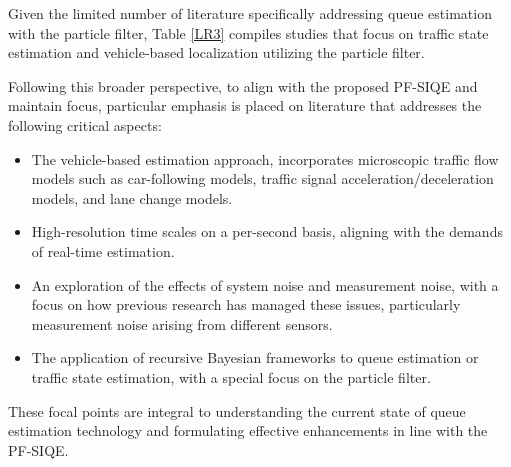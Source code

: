 Given the limited number of literature specifically addressing queue estimation with the particle filter, Table \ref{LR3} compiles studies that focus on traffic state estimation and vehicle-based localization utilizing the particle filter.

Following this broader perspective, to align with the proposed PF-SIQE and maintain focus, particular emphasis is placed on literature that addresses the following critical aspects:

\begin{itemize}
    \item The vehicle-based estimation approach, incorporates microscopic traffic flow models such as car-following models, traffic signal acceleration/deceleration models, and lane change models.
    \item High-resolution time scales on a per-second basis, aligning with the demands of real-time estimation.
    \item An exploration of the effects of system noise and measurement noise, with a focus on how previous research has managed these issues, particularly measurement noise arising from different sensors.
    \item The application of recursive Bayesian frameworks to queue estimation or traffic state estimation, with a special focus on the particle filter.
\end{itemize}
These focal points are integral to understanding the current state of queue estimation technology and formulating effective enhancements in line with the PF-SIQE.


